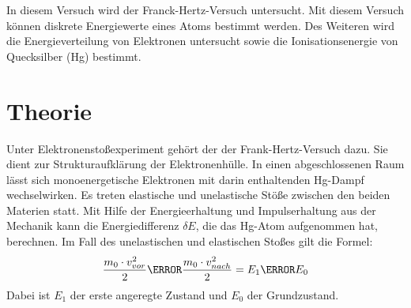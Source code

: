 In diesem Versuch wird der Franck-Hertz-Versuch untersucht.
Mit diesem Versuch können diskrete Energiewerte eines Atoms bestimmt werden. Des Weiteren wird
die Energieverteilung von Elektronen untersucht sowie die Ionisationsenergie von Quecksilber (Hg) bestimmt.
\section{Theorie}
Unter Elektronenstoßexperiment gehört der der Frank-Hertz-Versuch dazu. Sie dient zur Strukturaufklärung
der Elektronenhülle.
In einen abgeschlossenen Raum lässt sich monoenergetische Elektronen mit darin enthaltenden Hg-Dampf wechselwirken.
Es treten elastische und unelastische Stöße zwischen den beiden Materien statt.
Mit Hilfe der Energieerhaltung und Impulserhaltung aus der Mechanik kann die Energiedifferenz $\delta E$,
die das Hg-Atom aufgenommen hat, berechnen.
Im Fall des unelastischen und elastischen Stoßes gilt die Formel:
\begin{equation}
  \frac{m_0 \cdot v_{vor}^2} {2} \m \frac{m_0 \cdot v_{nach}^2} {2} = E_1 \m E_0
\label{eq:1}
\end{equation}
Dabei ist $E_1$ der erste angeregte Zustand und $E_0$ der Grundzustand.

